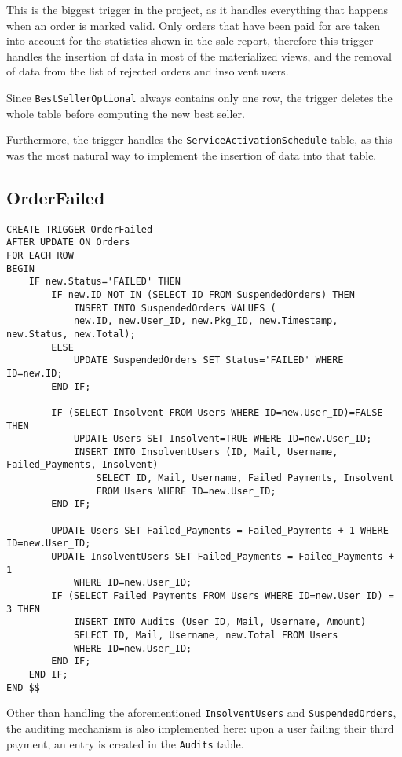 This is the biggest trigger in the project, as it handles everything that happens when an order is marked valid. Only orders that have been paid for are taken into account for the statistics shown in the sale report, therefore this trigger handles the insertion of data in most of the materialized views, and the removal of data from the list of rejected orders and insolvent users.

Since \texttt{BestSellerOptional} always contains only one row, the trigger deletes the whole table before computing the new best seller.

Furthermore, the trigger handles the \texttt{ServiceActivationSchedule} table, as this was the most natural way to implement the insertion of data into that table.

\subsection{OrderFailed}

\begin{lstlisting}[style=SQL]
CREATE TRIGGER OrderFailed
AFTER UPDATE ON Orders
FOR EACH ROW
BEGIN
    IF new.Status='FAILED' THEN
        IF new.ID NOT IN (SELECT ID FROM SuspendedOrders) THEN
            INSERT INTO SuspendedOrders VALUES (
            new.ID, new.User_ID, new.Pkg_ID, new.Timestamp, new.Status, new.Total);
        ELSE
            UPDATE SuspendedOrders SET Status='FAILED' WHERE ID=new.ID;
        END IF;

        IF (SELECT Insolvent FROM Users WHERE ID=new.User_ID)=FALSE THEN
            UPDATE Users SET Insolvent=TRUE WHERE ID=new.User_ID;
            INSERT INTO InsolventUsers (ID, Mail, Username, Failed_Payments, Insolvent)
                SELECT ID, Mail, Username, Failed_Payments, Insolvent
                FROM Users WHERE ID=new.User_ID;
        END IF;

        UPDATE Users SET Failed_Payments = Failed_Payments + 1 WHERE ID=new.User_ID;
        UPDATE InsolventUsers SET Failed_Payments = Failed_Payments + 1
            WHERE ID=new.User_ID;
        IF (SELECT Failed_Payments FROM Users WHERE ID=new.User_ID) = 3 THEN
            INSERT INTO Audits (User_ID, Mail, Username, Amount)
            SELECT ID, Mail, Username, new.Total FROM Users
            WHERE ID=new.User_ID;
        END IF;
    END IF;
END $$
\end{lstlisting}

Other than handling the aforementioned \texttt{InsolventUsers} and \texttt{SuspendedOrders}, the auditing mechanism is also implemented here: upon a user failing their third payment, an entry is created in the \texttt{Audits} table.

